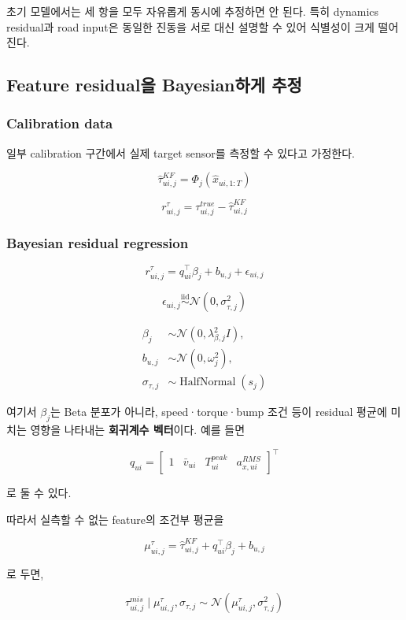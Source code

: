 \documentclass[letterpaper,10pt,journal,twocolumn]{ieeeconf}
\newcommand{\Normal}{\mathcal{N}}
\newcommand{\HalfNormal}{\operatorname{HalfNormal}}
\newcommand{\iid}{\overset{\mathrm{iid}}{\sim}}
\begin{document}
초기 모델에서는 세 항을 모두 자유롭게 동시에 추정하면 안 된다. 특히 dynamics residual과 road input은 동일한 진동을 서로 대신 설명할 수 있어 식별성이 크게 떨어진다.

\subsection{Feature residual을 Bayesian하게 추정}

\subsubsection{Calibration data}

일부 calibration 구간에서 실제 target sensor를 측정할 수 있다고 가정한다.

\[
\hat\tau_{ui,j}^{KF}
=
\Phi_j
\left(
\hat x_{ui,1:T}
\right)
\]

\[
r_{ui,j}^{\tau}
=
\tau_{ui,j}^{true}
-\hat\tau_{ui,j}^{KF}
\]

\subsubsection{Bayesian residual regression}

\[
r_{ui,j}^{\tau}
=
q_{ui}^{\top}\beta_j
+b_{u,j}
+\epsilon_{ui,j}
\]

\[
\epsilon_{ui,j}
\iid
\Normal(0,\sigma_{\tau,j}^{2})
\]

\[
\begin{aligned}
\beta_j &\sim\Normal(0,\lambda_{\beta,j}^{2}I),\\
b_{u,j} &\sim\Normal(0,\omega_j^2),\\
\sigma_{\tau,j} &\sim\HalfNormal(s_j)
\end{aligned}
\]

여기서 \(\beta_j\)는 Beta 분포가 아니라, speed·torque·bump 조건 등이 residual 평균에 미치는 영향을 나타내는 \textbf{회귀계수 벡터}이다. 예를 들면

\[
q_{ui}
=
\begin{bmatrix}
1&
\bar v_{ui}&
T_{ui}^{peak}&
a_{x,ui}^{RMS}
\end{bmatrix}^{\top}
\]

로 둘 수 있다.

따라서 실측할 수 없는 feature의 조건부 평균을

\[
\mu_{ui,j}^{\tau}
=
\hat\tau_{ui,j}^{KF}
+q_{ui}^{\top}\beta_j
+b_{u,j}
\]

로 두면,

\[
\tau_{ui,j}^{mis}\mid\mu_{ui,j}^{\tau},\sigma_{\tau,j}
\sim
\Normal\!\left(\mu_{ui,j}^{\tau},\sigma_{\tau,j}^{2}\right)
\]
\end{document}
